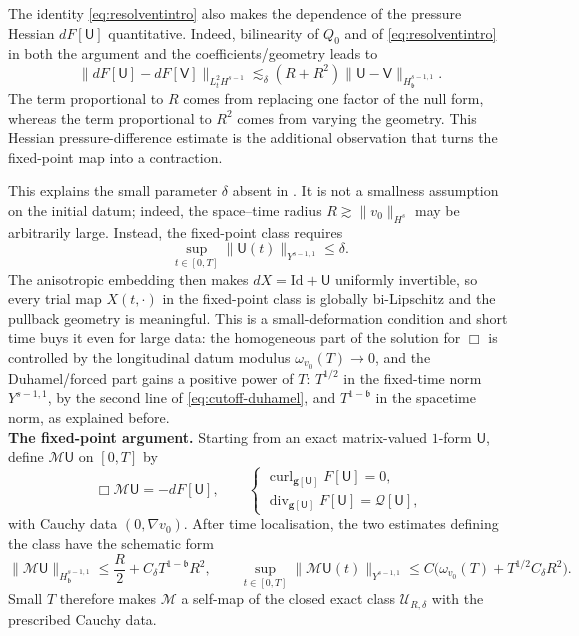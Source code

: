 \documentclass[11pt,reqno]{amsart}
\theoremstyle{plain}
\theoremstyle{definition}
\theoremstyle{remark}
\numberwithin{equation}{section}
\DeclareMathOperator{\Div}{div}
\DeclareMathOperator{\curl}{curl}
\newcommand{\breg}{\mathfrak b}
\newcommand{\Ufield}{\mathsf U}
\newcommand{\Vfield}{\mathsf V}
\newcommand{\gmetric}{\mathbf g}
\begin{document}
The identity \eqref{eq:resolventintro} also makes the dependence of the pressure Hessian $d F[\Ufield]$ quantitative. Indeed, bilinearity of $Q_0$ and of \eqref{eq:resolventintro} in both the argument and the coefficients/geometry leads to
\[
 \|dF[\Ufield]-dF[\Vfield]\|_{L^2_tH^{s-1}}
 \lesssim_\delta
 (R+R^2)\|\Ufield-\Vfield\|_{H_{\breg}^{s-1,1}}.
\]
The term proportional to $R$ comes from replacing one factor of the null form,
whereas the term proportional to $R^2$ comes from varying the geometry. This Hessian pressure-difference estimate is the additional observation that turns the
fixed-point map into a contraction.

This explains the small parameter $\delta$ absent in \cite{Zhang2024}.  It is not a smallness assumption
on the initial datum; indeed, the space--time radius $R\gtrsim\|v_0\|_{H^s}$ may be
arbitrarily large.  Instead, the fixed-point class requires
\[
 \sup_{t\in[0,T]}\|\Ufield(t)\|_{Y^{s-1,1}}\le\delta.
\]
The anisotropic embedding then makes $dX=\mathrm{Id}+\Ufield$ uniformly
invertible, so every trial map $X(t,\cdot)$ in the fixed-point class is globally bi-Lipschitz and the
pullback geometry is meaningful.  This is a small-deformation
condition and short time buys it even
for large data: the homogeneous part of the solution for $\Box$ is controlled by the longitudinal datum modulus
$\omega_{v_0}(T)\to0$, and the Duhamel/forced part gains a positive power of
$T$: $T^{1/2}$ in the fixed-time norm $Y^{s-1,1}$, by the second line of
\eqref{eq:cutoff-duhamel}, and $T^{1-\breg}$ in the spacetime norm, as explained
before.\\

\textbf{The fixed-point argument.} Starting from an exact matrix-valued $1$-form $\Ufield$, define $\mathcal M\Ufield$ on
$[0,T]$ by
\[
 \Box\mathcal M\Ufield=-dF[\Ufield],
 \qquad
 \begin{cases}
  \curl_{\gmetric[\Ufield]}F[\Ufield]=0,\\
  \Div_{\gmetric[\Ufield]}F[\Ufield]=\mathcal Q[\Ufield],
 \end{cases}
\]
with Cauchy data $(0,\nabla v_0)$. After time localisation, the two estimates
defining the class have the schematic form
\[
 \|\mathcal M\Ufield\|_{H_{\breg}^{s-1,1}}
 \le \frac R2+C_\delta T^{1-\breg}R^2, \qquad
 \sup_{t\in[0,T]}
 \|\mathcal M\Ufield(t)\|_{Y^{s-1,1}}
 \le
 C\big(
   \omega_{v_0}(T)+T^{1/2}C_\delta R^2\big).
\]
Small $T$ therefore makes $\mathcal M$ a self-map of the closed exact class
$\mathcal U_{R,\delta}$ with the prescribed Cauchy data.
\end{document}
